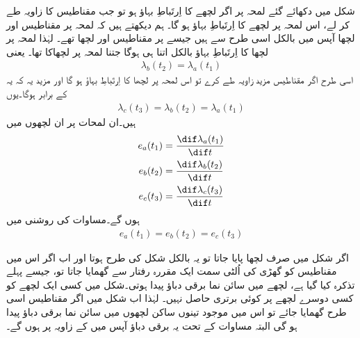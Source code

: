  شکل   میں دکھائے گئے لمحہ  پر  اگر لچھے  کا  اِرتَباطِ بہاؤ  ہو تو جب مقناطیس  کا زاویہ طے کر لے، اس لمحہ  پر  لچھے  کا اِرتَباطِ بہاؤ  ہو گا۔ ہم  دیکھتے ہیں کہ لمحہ  پر مقناطیس اور لچھا  آپس میں بالکل اسی طرح سے ہیں جیسے  پر مقناطیس اور لچھا  تھے۔ لہٰذا لمحہ  پر لچھا  کا اِرتَباطِ بہاؤ بالکل اتنا ہی ہوگا جتنا لمحہ  پر   لچھاکا تھا۔ یعنی
\begin{align}
\lambda_b(t_2)=\lambda_a(t_1)
\end{align}
اسی طرح اگر مقناطیس مزید   زاویہ طے کرے تو اس لمحہ  پر لچھا  کا اِرتَباطِ بہاؤ   ہو گا اور مزید یہ کہ یہ  کے برابر ہوگا۔یوں
\begin{align}
\lambda_c(t_3)=\lambda_b(t_2)=\lambda_a(t_1)
\end{align}
ہیں۔ان لمحات پر ان  لچھوں میں
\begin{align}
e_a(t_1)&=\frac{\dif \lambda_a(t_1)}{\dif t}\\
e_b(t_2)&=\frac{\dif \lambda_b(t_2)}{\dif t}\\
e_c(t_3)&=\frac{\dif \lambda_c(t_3)}{\dif t}
\end{align}
ہوں گے۔مساوات    کی روشنی میں
\begin{align}
e_a(t_1)=e_b(t_2)=e_c(t_3)
\end{align} 

اگر شکل  میں صرف لچھا  پایا جاتا تو یہ بالکل شکل    کی طرح ہوتا اور اب اگر اس میں مقناطیس کو گھڑی کی اُلٹی سمت ایک مقررہ رفتار  سے گھمایا جاتا تو، جیسے پہلے تذکرہ کیا گیا ہے، لچھے  میں سائن نما برقی دباؤ پیدا ہوتی۔شکل   میں کسی ایک لچھے کو کسی دوسرے لچھے پر کوئی برتری حاصل نہیں۔ لہٰذا اب شکل   میں اگر مقناطیس اسی طرح گھمایا جائے تو اس میں موجود تینوں ساکن لچھوں میں سائن نما برقی دباؤ پیدا ہو گی البتہ مساوات    کے تحت یہ برقی دباؤ آپس میں   کے زاویہ پر ہوں گے۔


